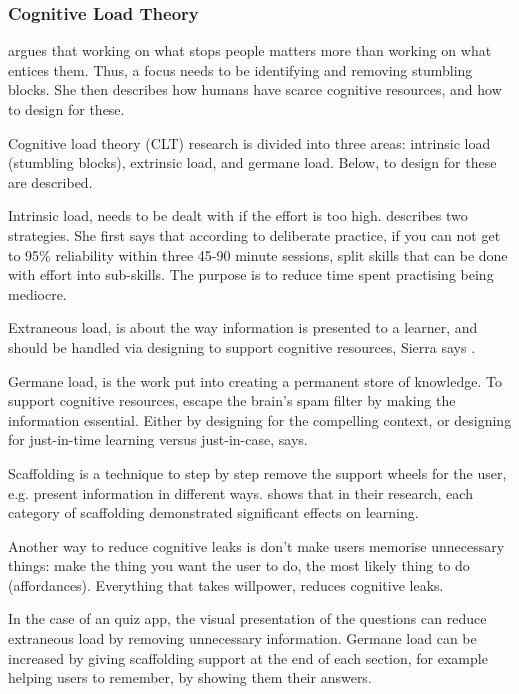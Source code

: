 \subsubsection{Cognitive Load Theory}

\cite{sierra} argues that working on what stops people matters more than working on what entices them. Thus, a focus needs to be identifying and removing stumbling blocks. She then describes how humans have scarce cognitive resources, and how to design for these.

Cognitive load theory (CLT) research is divided into three areas: intrinsic load (stumbling blocks), extrinsic load, and germane load. Below, to design for these are described.

Intrinsic load, needs to be dealt with if the effort is too high. \cite{sierra} describes two strategies. She first says that according to deliberate practice, if you can not get to 95\% reliability within three 45-90 minute sessions, split skills that can be done with effort into sub-skills. The purpose is to reduce time spent practising being mediocre.

Extraneous load, is about the way information is presented to a learner, and should be handled via designing to support cognitive resources, Sierra says \citep{sierra}.

Germane load, is the work put into creating a permanent store of knowledge. To support cognitive resources, escape the brain's spam filter by making the information essential. Either by designing for the compelling context, or designing for just-in-time learning versus just-in-case, \cite{sierra} says.

Scaffolding is a technique to step by step remove the support wheels for the user, e.g. present information in different ways. \cite{gates} shows that in their research, each category of scaffolding demonstrated significant effects on learning.

Another way to reduce cognitive leaks is don't make users memorise unnecessary things: make the thing you want the user to do, the most likely thing to do (affordances). Everything that takes willpower, reduces cognitive leaks.

In the case of an quiz app, the visual presentation of the questions can reduce extraneous load by removing unnecessary information. Germane load can be increased by giving scaffolding support at the end of each section, for example helping users to remember, by showing them their answers.

